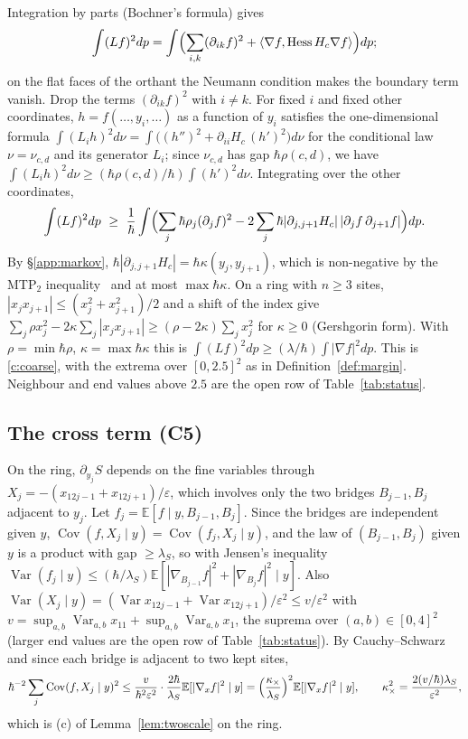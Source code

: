 \documentclass[11pt,a4paper]{article}
\theoremstyle{definition}
\theoremstyle{remark}
\newcommand{\hk}{\hbar\kappa}
\newcommand{\hr}{\hbar\rho}
\newcommand{\E}{\mathbb{E}}
\DeclareMathOperator{\Cov}{Cov}
\DeclareMathOperator{\Var}{Var}
\begin{document}
Integration by parts (Bochner's formula) gives \[\int(Lf)^2dp=\int\Bigl(\sum_{i,k}(\partial_{ik}f)^2+\langle\nabla f,\operatorname{Hess}H_c\nabla f\rangle\Bigr)dp;\] on the flat faces of the orthant the Neumann condition makes the boundary term vanish. Drop the terms $(\partial_{ik}f)^2$ with $i\ne k$. For fixed $i$ and fixed other coordinates, $h=f(\dots,y_i,\dots)$ as a function of $y_i$ satisfies the one-dimensional formula $\int(L_ih)^2d\nu=\int\bigl((h'')^2+\partial_{ii}H_c\,(h')^2\bigr)d\nu$ for the conditional law $\nu=\nu_{c,d}$ and its generator $L_i$; since $\nu_{c,d}$ has gap $\hr(c,d)$, we have $\int(L_ih)^2d\nu\ge(\hr(c,d)/\hbar)\int(h')^2d\nu$. Integrating over the other coordinates,
\[
\int(Lf)^2dp\ \ge\ \frac1\hbar\int\Bigl(\sum_j\hr_j(\partial_jf)^2-2\sum_j\hbar|\partial_{j,j+1}H_c|\,|\partial_jf\,\partial_{j+1}f|\Bigr)dp .
\]
By \S\ref{app:markov}, $\hbar|\partial_{j,j+1}H_c|=\hk(y_j,y_{j+1})$, which is non-negative by the MTP$_2$ inequality~\cite{KR} and at most $\max\hk$. On a ring with $n\ge3$ sites, $|x_jx_{j+1}|\le(x_j^2+x_{j+1}^2)/2$ and a shift of the index give $\sum_j\rho x_j^2-2\kappa\sum_j|x_jx_{j+1}|\ge(\rho-2\kappa)\sum_jx_j^2$ for $\kappa\ge0$ (Gershgorin form). With $\rho=\min\hr$, $\kappa=\max\hk$ this is $\int(Lf)^2dp\ge(\lambda/\hbar)\int|\nabla f|^2dp$. This is \ref{c:coarse}, with the extrema over $[0,2.5]^2$ as in Definition~\ref{def:margin}. Neighbour and end values above $2.5$ are the open row of Table~\ref{tab:status}.

\subsection{The cross term (C5)}\label{app:cross}
On the ring, $\partial_{y_j}S$ depends on the fine variables through $X_j=-(x_{12j-1}+x_{12j+1})/\varepsilon$, which involves only the two bridges $B_{j-1},B_j$ adjacent to $y_j$. Let $f_j=\E[f\mid y,B_{j-1},B_j]$. Since the bridges are independent given $y$, $\Cov(f,X_j\mid y)=\Cov(f_j,X_j\mid y)$, and the law of $(B_{j-1},B_j)$ given $y$ is a product with gap $\ge\lambda_S$, so with Jensen's inequality $\Var(f_j\mid y)\le(\hbar/\lambda_S)\E[|\nabla_{B_{j-1}}f|^2+|\nabla_{B_j}f|^2\mid y]$. Also $\Var(X_j\mid y)=(\Var x_{12j-1}+\Var x_{12j+1})/\varepsilon^2\le v/\varepsilon^2$ with $v=\sup_{a,b}\Var_{a,b}x_{11}+\sup_{a,b}\Var_{a,b}x_1$, the suprema over $(a,b)\in[0,4]^2$ (larger end values are the open row of Table~\ref{tab:status}). By Cauchy--Schwarz and since each bridge is adjacent to two kept sites,
\[
\hbar^{-2}\sum_j\Cov(f,X_j\mid y)^2\le\frac{v}{\hbar^2\varepsilon^2}\cdot\frac{2\hbar}{\lambda_S}\E[|\nabla_xf|^2\mid y]=\Bigl(\frac{\kappa_\times}{\lambda_S}\Bigr)^2\E[|\nabla_xf|^2\mid y],\qquad\kappa_\times^2=\frac{2(v/\hbar)\lambda_S}{\varepsilon^2},
\]
which is (c) of Lemma~\ref{lem:twoscale} on the ring.
\end{document}
